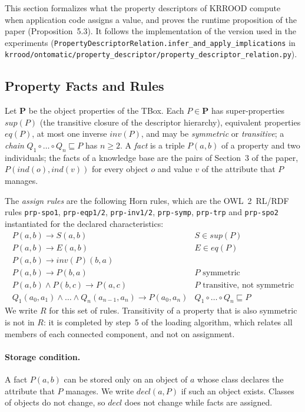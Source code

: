 \documentclass[11pt, a4paper]{article}
\theoremstyle{plain}
\theoremstyle{definition}
\theoremstyle{remark}
\begin{document}
This section formalizes what the property descriptors of KRROOD compute when application code
assigns a value, and proves the runtime proposition of the paper (Proposition~5.3). It follows
the implementation of the version used in the experiments
(\texttt{PropertyDescriptorRelation.infer\_and\_apply\_implications} in
\texttt{krrood/ontomatic/property\_descriptor/property\_descriptor\_relation.py}).

\subsection{Property Facts and Rules}

Let $\mathbf{P}$ be the object properties of the TBox. Each $P\in\mathbf{P}$ has
super-properties $\mathit{sup}(P)$ (the transitive closure of the descriptor hierarchy),
equivalent properties $\mathit{eq}(P)$, at most one inverse $\mathit{inv}(P)$, and may be
\emph{symmetric} or \emph{transitive}; a \emph{chain} $Q_1\circ\dots\circ Q_n\sqsubseteq P$ has
$n\geq 2$. A \emph{fact} is a triple $P(a,b)$ of a property and two individuals; the facts of a
knowledge base are the pairs of Section~3 of the paper, $P(\mathit{ind}(o),\mathit{ind}(v))$ for
every object $o$ and value $v$ of the attribute that $P$ manages.

The \emph{assign rules} are the following Horn rules, which are the OWL~2~RL/RDF rules
\texttt{prp-spo1}, \texttt{prp-eqp1/2}, \texttt{prp-inv1/2}, \texttt{prp-symp},
\texttt{prp-trp} and \texttt{prp-spo2} instantiated for the declared characteristics:
\[
\begin{array}{ll}
P(a,b)\rightarrow S(a,b) & S\in\mathit{sup}(P)\\
P(a,b)\rightarrow E(a,b) & E\in\mathit{eq}(P)\\
P(a,b)\rightarrow \mathit{inv}(P)(b,a) & \\
P(a,b)\rightarrow P(b,a) & P \text{ symmetric}\\
P(a,b)\wedge P(b,c)\rightarrow P(a,c) & P \text{ transitive, not symmetric}\\
Q_1(a_0,a_1)\wedge\dots\wedge Q_n(a_{n-1},a_n)\rightarrow P(a_0,a_n) & Q_1\circ\dots\circ Q_n\sqsubseteq P
\end{array}
\]
We write $R$ for this set of rules. Transitivity of a property that is also symmetric is not in
$R$: it is completed by step~5 of the loading algorithm, which relates all members of each
connected component, and not on assignment.

\paragraph{Storage condition.} A fact $P(a,b)$ can be stored only on an object of $a$ whose
class declares the attribute that $P$ manages. We write $\mathit{decl}(a,P)$ if such an object
exists. Classes of objects do not change, so $\mathit{decl}$ does not change while facts are
assigned.
\end{document}
